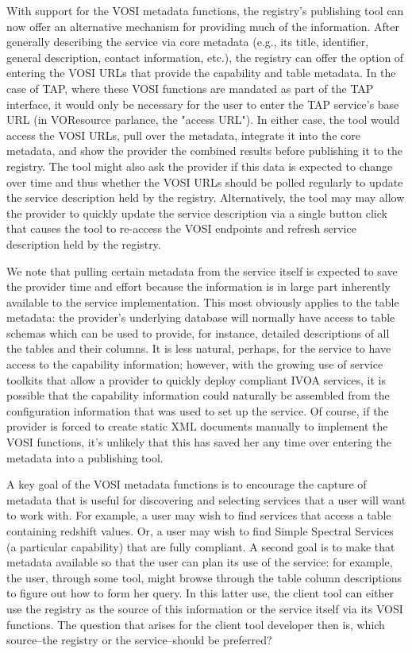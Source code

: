 \documentclass[11pt,letter]{ivoa}
\begin{document}
With support for the VOSI metadata functions, the registry's publishing tool can now offer an alternative mechanism for providing much of the information. After generally describing the service via core metadata (e.g., its title, identifier, general description, contact information, etc.), the registry can offer the option of entering the VOSI URLs that provide the capability and table metadata. In the case of TAP, where these VOSI functions are mandated as part of the TAP interface, it would only be necessary for the user to enter the TAP service's base URL (in VOResource parlance, the "access URL"). In either case, the tool would access the VOSI URLs, pull over the metadata, integrate it into the core metadata, and show the provider the combined results before publishing it to the registry. The tool might also ask the provider if this data is expected to change over time and thus whether the VOSI URLs should be polled regularly to update the service description held by the registry. Alternatively, the tool may may allow the provider to quickly update the service description via a single button click that causes the tool to re-access the VOSI endpoints and refresh service description held by the registry.

We note that pulling certain metadata from the service itself is expected to save the provider time and effort because the information is in large part inherently available to the service implementation. This most obviously applies to the table metadata: the provider's underlying database will normally have access to table schemas which can be used to provide, for instance, detailed descriptions of all the tables and their columns. It is less natural, perhaps, for the service to have access to the capability information; however, with the growing use of service toolkits that allow a provider to quickly deploy compliant IVOA services, it is possible that the capability information could naturally be assembled from the configuration information that was used to set up the service. Of course, if the provider is forced to create static XML documents manually to implement the VOSI functions, it's unlikely that this has saved her any time over entering the metadata into a publishing tool.

A key goal of the VOSI metadata functions is to encourage the capture of metadata that is useful for discovering and selecting services that a user will want to work with. For example, a user may wish to find services that access a table containing redshift values. Or, a user may wish to find Simple Spectral Services (a particular capability) that are fully compliant. A second goal is to make that metadata available so that the user can plan its use of the service: for example, the user, through some tool, might browse through the table column descriptions to figure out how to form her query. In this latter use, the client tool can either use the registry as the source of this information or the service itself via its VOSI functions. The question that arises for the client tool developer then is, which source--the registry or the service--should be preferred?
\end{document}
